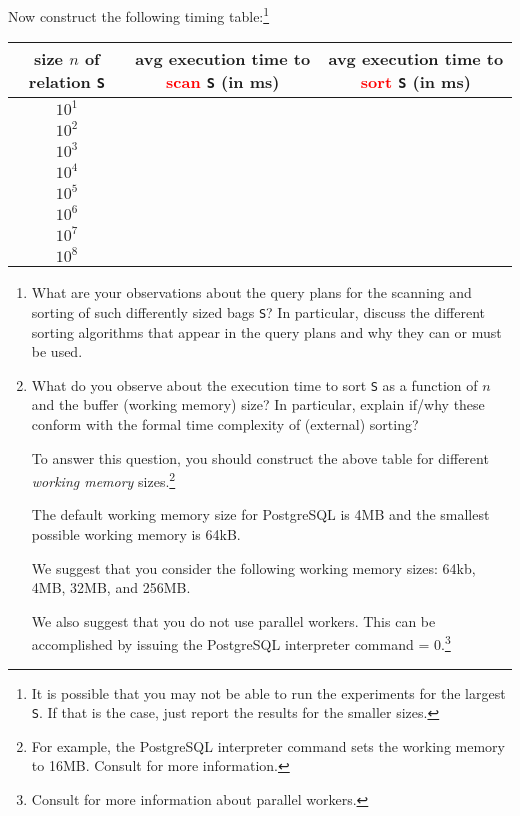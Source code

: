 \documentclass{article}
\newcommand{\blue}[1]{{\color{blue}#1}}
\begin{document}
\begin{enumerate}[resume]
Now construct the following timing table:\footnote{It is possible that you may not be able to run the experiments for the largest {\tt S}.   If that is the case, just report the results for the smaller sizes.}
\begin{center}
\begin{tabular}{c|c|c}
size $n$ of relation {\tt S} & avg execution time to \textcolor{red}{scan} {\tt S} (in ms) &avg execution time to \textcolor{red}{sort} {\tt S} (in ms) \\ \hline
$10^1$ & & \\
$10^2$ & & \\
$10^3$ &  & \\
$10^4$ & & \\
$10^5$ &  & \\
$10^6$ &  & \\
$10^7$ & & \\
$10^8$ &  & \\
\end{tabular}
\end{center}

\begin{enumerate}
\item\label{sortTimea} What are your observations about the query plans for the scanning and sorting of such differently sized bags {\tt S}?   In particular, discuss the different sorting algorithms that 
appear in the query plans and why they can or must be used.
\item What do you observe about the execution time to sort {\tt S} as a function of $n$ and the buffer (working memory) size?   In particular, explain if/why
these conform with the formal time complexity of (external) sorting? 

To answer this question, you should construct the above table for different \emph{working memory} sizes.\footnote{For example, the PostgreSQL interpreter command \blue{{\tt set work\_mem = '16MB'}} sets the working memory to 16MB.  Consult \blue{{\tt https://www.postgresql.org/docs/14/runtime-config-resource.html}} for more information.}

The default working memory size for PostgreSQL is 4MB and the smallest possible working memory is 64kB.

We suggest that you consider the following working memory sizes:  64kb, 4MB, 32MB, and 256MB.

We also suggest that you do not use parallel workers.   This can be accomplished by 
issuing the PostgreSQL interpreter command \blue{{\tt set max\_parallel\_workers} = 0}.\footnote{
Consult \blue{{\tt https://www.postgresql.org/docs/14/runtime-config-resource.html}} for more information
about parallel workers.}


\end{enumerate}
\end{enumerate}
\end{document}
